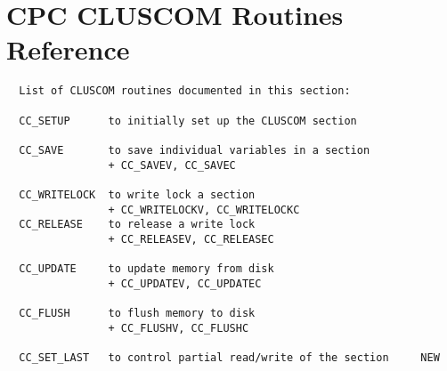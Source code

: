 \newpage
\part{CPC CLUSCOM Routines Reference}
\vspace*{1cm}
\begin{verbatim}
  List of CLUSCOM routines documented in this section:

  CC_SETUP      to initially set up the CLUSCOM section

  CC_SAVE       to save individual variables in a section
                + CC_SAVEV, CC_SAVEC

  CC_WRITELOCK  to write lock a section
                + CC_WRITELOCKV, CC_WRITELOCKC
  CC_RELEASE    to release a write lock
                + CC_RELEASEV, CC_RELEASEC

  CC_UPDATE     to update memory from disk
                + CC_UPDATEV, CC_UPDATEC

  CC_FLUSH      to flush memory to disk
                + CC_FLUSHV, CC_FLUSHC

  CC_SET_LAST   to control partial read/write of the section     NEW
\end{verbatim}

